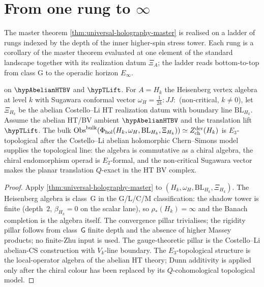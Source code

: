 \section{From one rung to $\infty$}
\label{sec:climax-rungs}

The master theorem \cref{thm:universal-holography-master} is
realised on a ladder of rungs indexed by the depth of the inner
higher-spin stress tower. Each rung is a corollary of the master
theorem evaluated at one element of the standard landscape together
with its realization datum \(\Xi_A\); the ladder reads bottom-to-top
from class G to the operadic horizon \(E_{\infty}\).

\begin{corollary}
\ClaimStatusConditional{} on \(\hypAbelianHTBV\) and \(\hypTLift\).
For \(A=H_k\) the Heisenberg vertex algebra at level \(k\) with
Sugawara conformal vector
\(\omega_H=\tfrac{1}{2k}{:}JJ{:}\) (non-critical, \(k\neq0\)),
let \(\Xi_{H_k}\) be the abelian Costello--Li HT realization datum
with boundary line \(\mathrm{BL}_{H_k}\). Assume the abelian HT/BV
ambient \(\hypAbelianHTBV\) and the translation lift \(\hypTLift\).
The bulk
$\mathrm{Obs}^{\mathrm{bulk}}(\Phi_{\mathrm{hol}}(H_{k},\omega_H,\mathrm{BL}_{H_k},\Xi_{H_k}))
\simeq Z^{\mathrm{der}}_{\mathrm{ch}}(H_{k})$ is
$E_{3}$-topological after the Costello--Li abelian
holomorphic Chern--Simons model supplies the topological line:
the algebra is commutative as a chiral algebra, the chiral
endomorphism operad is $E_{2}$-formal, and the non-critical
Sugawara vector makes the planar translation $Q$-exact in the
HT BV complex.
\end{corollary}

\begin{proof}
Apply \cref{thm:universal-holography-master} to
\((H_k,\omega_H,\mathrm{BL}_{H_k},\Xi_{H_k})\).
The Heisenberg algebra is class~G in the
G/L/C/M classification: the shadow tower is finite (depth~$2$,
$\beta_{H_{k}} = 0$ on the scalar lane), so
$\rho_{*}(H_{k}) = \infty$ and the Banach completion is the algebra
itself. The convergence pillar trivialises; the rigidity pillar
follows from class~$\mathsf G$ finite depth and the absence of higher
Massey products; no finite-Zhu input is used. The gauge-theoretic
pillar is the Costello--Li
abelian-CS construction with $V_{k}$-line boundary. The
$E_{3}$-topological structure is the local-operator algebra of the
abelian HT theory; Dunn additivity is applied only after the chiral
colour has been replaced by its $Q$-cohomological topological model.
\end{proof}

